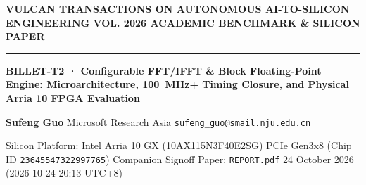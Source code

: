 \documentclass[11pt,a4paper]{article}
\begin{document}
{\scriptsize\sffamily\textcolor{vulcan}{\textbf{VULCAN TRANSACTIONS ON AUTONOMOUS AI-TO-SILICON ENGINEERING \hfill VOL. 2026 \textperiodcentered{} ACADEMIC BENCHMARK \& SILICON PAPER}}\par}

\vspace{1pt}\textcolor{vulcan}{\rule{\textwidth}{1.2pt}}\vspace{3pt}

\begin{center}

{\sffamily\LARGE\bfseries BILLET-T2 · Configurable FFT/\allowbreak{}IFFT \& Block Floating-Point Engine: Microarchitecture, 100~MHz+ Timing Closure, and Physical Arria 10 FPGA Evaluation\par}\vspace{3pt}

{\small\sffamily\textbf{Sufeng Guo} \textperiodcentered{} Microsoft Research Asia \textperiodcentered{} \texttt{sufeng\_guo@smail.nju.edu.cn}\par}\vspace{1pt}

{\scriptsize\sffamily\textcolor{black!75}{Silicon Platform: Intel Arria 10 GX (\allowbreak{}10AX115N3F40E2SG)\allowbreak{} PCIe Gen3x8 (Chip ID \texttt{23645547322997765}) \textperiodcentered{} Companion Signoff Paper: \texttt{REPORT.pdf} \textperiodcentered{} 24 October 2026 (\allowbreak{}2026-10-24 20:13 UTC+\allowbreak{}8)\allowbreak{}}\par}

\end{center}\vspace{2pt}
\end{document}
